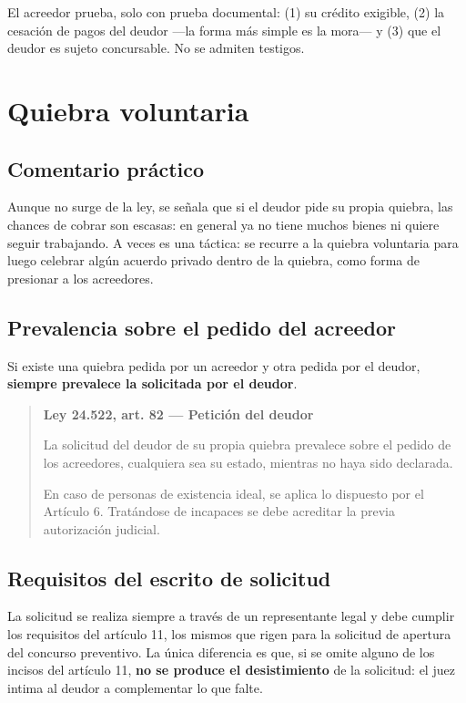 \documentclass[12pt,oneside]{book}
\newenvironment{articulo}[1]
  {\begin{quote}\small\textbf{#1}\par\smallskip}
  {\end{quote}}
\begin{document}
\begin{important}
El acreedor prueba, solo con prueba documental: (1) su crédito exigible, (2) la cesación de pagos del deudor ---la forma más simple es la mora--- y (3) que el deudor es sujeto concursable. No se admiten testigos.
\end{important}

\section{Quiebra voluntaria}

\subsection{Comentario práctico}

Aunque no surge de la ley, se señala que si el deudor pide su propia quiebra, las chances de cobrar son escasas: en general ya no tiene muchos bienes ni quiere seguir trabajando. A veces es una táctica: se recurre a la quiebra voluntaria para luego celebrar algún acuerdo privado dentro de la quiebra, como forma de presionar a los acreedores.

\subsection{Prevalencia sobre el pedido del acreedor}

Si existe una quiebra pedida por un acreedor y otra pedida por el deudor, \textbf{siempre prevalece la solicitada por el deudor}.

\begin{articulo}{Ley 24.522, art. 82 --- Petición del deudor}
La solicitud del deudor de su propia quiebra prevalece sobre el pedido de los acreedores, cualquiera sea su estado, mientras no haya sido declarada.

En caso de personas de existencia ideal, se aplica lo dispuesto por el Artículo 6. Tratándose de incapaces se debe acreditar la previa autorización judicial.
\end{articulo}

\subsection{Requisitos del escrito de solicitud}

La solicitud se realiza siempre a través de un representante legal y debe cumplir los requisitos del artículo 11, los mismos que rigen para la solicitud de apertura del concurso preventivo. La única diferencia es que, si se omite alguno de los incisos del artículo 11, \textbf{no se produce el desistimiento} de la solicitud: el juez intima al deudor a complementar lo que falte.
\end{document}
